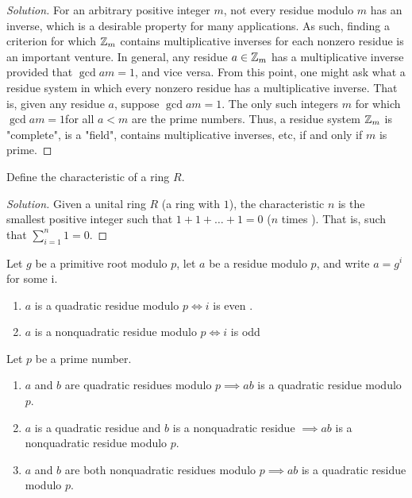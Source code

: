 \documentclass[11pt]{article}
\begin{document}
\begin{proof}[Solution]
For an arbitrary positive integer $ m $, not every residue modulo $ m $ has an inverse, which is a desirable property for many applications. As such, finding a criterion for which $ \mathbb{Z}_{m} $ contains multiplicative inverses for each nonzero residue is an important venture. In general, any residue $ a \in \mathbb{Z}_{m} $ has a multiplicative inverse provided that $ \gcd{a}{m} = 1 $, and vice versa. From this point, one might ask what a residue system in which every nonzero residue has a multiplicative inverse. That is, given any residue $ a $, suppose $ \gcd{a}{m} = 1 $. The only such integers $ m $ for which $ \gcd{a}{m}  = 1 $for all $ a < m $ are the prime numbers. Thus, a residue system $ \mathbb{Z}_{m} $ is "complete", is a "field", contains multiplicative inverses, etc, if and only if $ m $ is prime.
\end{proof}

\begin{exercise}{12}
Define the characteristic of a ring $ R $.
\end{exercise}

\begin{proof}[Solution]
Given a unital ring $ R $ (a ring with $ 1 $), the characteristic $ n $ is the smallest positive integer such that $ 1 + 1 + \dots + 1 = 0 $ ($ n $ times ). That is, such that
$ \sum_{i = 1}^{n} 1 = 0$.
\end{proof}

\begin{lemma}{2}
Let $ g $ be a primitive root modulo $ p $, let $ a  $ be a residue modulo $ p $, and write $ a = g^{i} $ for some i.
\begin{enumerate}
\item $ a $ is a quadratic residue modulo $ p \iff i $ is even .
\item $ a $ is a nonquadratic residue modulo $ p \iff i $ is odd
\end{enumerate}
\end{lemma}

\begin{exercise}{13}
Let $ p $ be a prime number.
\begin{enumerate}
\item $ a $ and $ b $ are quadratic residues modulo $ p \implies ab $ is a quadratic residue modulo $ p $.
\item $ a $ is a quadratic residue and $ b $ is a nonquadratic residue $ \implies ab $ is a nonquadratic residue modulo $ p $.
\item $ a $ and $ b $ are both nonquadratic residues modulo $ p \implies ab $ is a quadratic residue modulo $ p $.
\end{enumerate}
\end{exercise}
\end{document}
